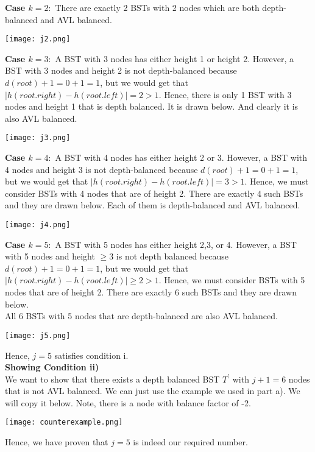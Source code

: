 \documentclass[12pt]{article}
\begin{document}
\textbf{Case $k = 2:$} There are exactly 2 BSTs with 2 nodes which are both depth-balanced and AVL balanced.

\texttt{[image: j2.png]} 

\textbf{Case $k = 3:$} A BST with 3 nodes has either height 1 or height 2. However, a BST with 3 nodes and height 2 is not depth-balanced because $d(root) + 1 = 0 + 1 = 1$, but we would get that $|h(root.right) - h(root.left)| = 2 > 1$. Hence, there is only 1 BST with 3 nodes and height 1 that is depth balanced. It is drawn below. And clearly it is also AVL balanced. 

\texttt{[image: j3.png]} 

\textbf{Case $k = 4:$} A BST with 4 nodes has either height 2 or 3. However, a BST with 4 nodes and height 3 is not depth-balanced because $d(root) + 1 = 0 + 1 = 1$, but we would get that $|h(root.right) - h(root.left)| = 3 > 1$. Hence, we must consider BSTs with 4 nodes that are of height 2. There are exactly 4 such BSTs and they are drawn below. Each of them is depth-balanced and AVL balanced. 

\texttt{[image: j4.png]} 

\textbf{Case $k = 5:$} A BST with 5 nodes has either height 2,3, or 4. However, a BST with 5 nodes and height $\geq 3$ is not depth balanced because $d(root) + 1 = 0 + 1 = 1$, but we would get that $|h(root.right) - h(root.left)| \geq 2 > 1$. Hence, we must consider BSTs with 5 nodes that are of height 2. There are exactly 6 such BSTs and they are drawn below. \\

All 6 BSTs with 5 nodes that are depth-balanced are also AVL balanced. 

\texttt{[image: j5.png]} 

Hence, $j = 5$ satisfies condition i. \\

\textbf{Showing Condition ii)} \\

We want to show that there exists a depth balanced BST $T^\prime$ with $j + 1 = 6$ nodes that is not AVL balanced. We can just use the example we used in part a). We will copy it below. Note, there is a node with balance factor of -2. 

\texttt{[image: counterexample.png]} 

Hence, we have proven that $j = 5$ is indeed our required number.
\end{document}

